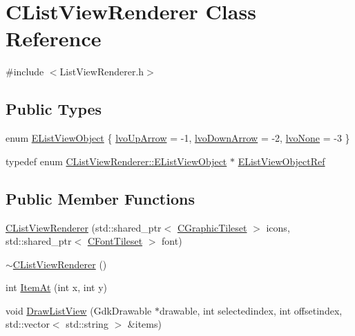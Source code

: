 \hypertarget{classCListViewRenderer}{}\section{C\+List\+View\+Renderer Class Reference}
\label{classCListViewRenderer}


{\ttfamily \#include $<$List\+View\+Renderer.\+h$>$}

\subsection*{Public Types}
\begin{DoxyCompactItemize}
\item 
enum \hyperlink{classCListViewRenderer_a120f3c9b0b96dd6e9bce814a52aafb93}{E\+List\+View\+Object} \{ \hyperlink{classCListViewRenderer_a120f3c9b0b96dd6e9bce814a52aafb93a097e5e7377e3436187159f67e1aafbe1}{lvo\+Up\+Arrow} = -\/1, 
\hyperlink{classCListViewRenderer_a120f3c9b0b96dd6e9bce814a52aafb93af916162772cb53552d541174c8354036}{lvo\+Down\+Arrow} = -\/2, 
\hyperlink{classCListViewRenderer_a120f3c9b0b96dd6e9bce814a52aafb93a2c1b367eb65f29abd94562e57d58560a}{lvo\+None} = -\/3
 \}
\item 
typedef enum \hyperlink{classCListViewRenderer_a120f3c9b0b96dd6e9bce814a52aafb93}{C\+List\+View\+Renderer\+::\+E\+List\+View\+Object} $\ast$ \hyperlink{classCListViewRenderer_a480fc50c1a5f78ff25b83a8c7973ebd3}{E\+List\+View\+Object\+Ref}
\end{DoxyCompactItemize}
\subsection*{Public Member Functions}
\begin{DoxyCompactItemize}
\item 
\hyperlink{classCListViewRenderer_af84040577d38c39d1e7bbf7b5e62bd74}{C\+List\+View\+Renderer} (std\+::shared\+\_\+ptr$<$ \hyperlink{classCGraphicTileset}{C\+Graphic\+Tileset} $>$ icons, std\+::shared\+\_\+ptr$<$ \hyperlink{classCFontTileset}{C\+Font\+Tileset} $>$ font)
\item 
\hyperlink{classCListViewRenderer_a7faaf42f2cb2c2898e8f52c49d33d92a}{$\sim$\+C\+List\+View\+Renderer} ()
\item 
int \hyperlink{classCListViewRenderer_a36438b9987f7c751d33c6fe322843979}{Item\+At} (int x, int y)
\item 
void \hyperlink{classCListViewRenderer_a870a37b08daedfab617bae1ff705a919}{Draw\+List\+View} (Gdk\+Drawable $\ast$drawable, int selectedindex, int offsetindex, std\+::vector$<$ std\+::string $>$ \&items)
\end{DoxyCompactItemize}

